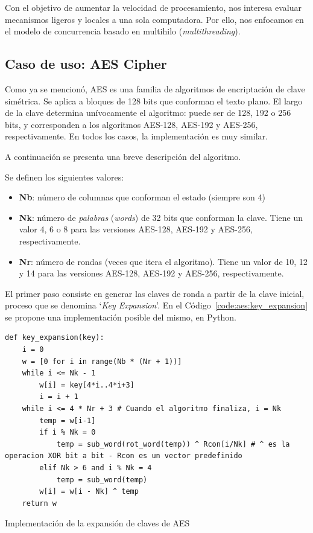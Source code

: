 \documentclass[11pt]{article}
\let\Oldsubsection\subsection
\renewcommand{\subsection}{\FloatBarrier\Oldsubsection}
\newcommand{\english}[1]{\textit{#1}}
\newcommand{\technical}[1]{\textit{#1}}
\begin{document}
Con el objetivo de aumentar la velocidad de procesamiento, nos interesa evaluar mecanismos ligeros y locales a una sola computadora. Por ello, nos enfocamos en el modelo de concurrencia basado en multihilo (\english{multithreading}).

\subsection{Caso de uso: AES Cipher}

Como ya se mencionó, AES es una familia de algoritmos de encriptación de clave simétrica. Se aplica a bloques de 128 bits que conforman el texto plano. El largo de la clave determina unívocamente el algoritmo: puede ser de 128, 192 o 256 bits, y corresponden a los algoritmos AES-128, AES-192 y AES-256, respectivamente. En todos los casos, la implementación es muy similar.

A continuación se presenta una breve descripción del algoritmo.

Se definen los siguientes valores:

\begin{itemize}
    \item \textbf{Nb}: número de columnas que conforman el estado (siempre son 4)
    \item \textbf{Nk}: número de \technical{palabras} (\english{words}) de 32 bits que conforman la clave. Tiene un valor 4, 6 o 8 para las versiones AES-128, AES-192 y AES-256, respectivamente.
    \item \textbf{Nr}: número de rondas (veces que itera el algoritmo). Tiene un valor de 10, 12 y 14 para las versiones AES-128, AES-192 y AES-256, respectivamente.
\end{itemize}

El primer paso consiste en generar las claves de ronda a partir de la clave inicial, proceso que se denomina `\english{Key Expansion}'. En el Código~\ref{code:aes:key_expansion} se propone una implementación posible del mismo, en Python.

\begin{listing}[h] %
\begin{verbatim}
def key_expansion(key):
    i = 0
    w = [0 for i in range(Nb * (Nr + 1))]
    while i <= Nk - 1
        w[i] = key[4*i..4*i+3]
        i = i + 1
    while i <= 4 * Nr + 3 # Cuando el algoritmo finaliza, i = Nk
        temp = w[i-1]
        if i % Nk = 0
            temp = sub_word(rot_word(temp)) ^ Rcon[i/Nk] # ^ es la operacion XOR bit a bit - Rcon es un vector predefinido
        elif Nk > 6 and i % Nk = 4
            temp = sub_word(temp)
        w[i] = w[i - Nk] ^ temp
    return w
\end{verbatim}
\caption{Implementación de la expansión de claves de AES}
\label{code:aes:key_expansion}
\end{listing}
\end{document}
